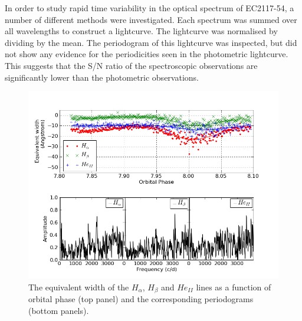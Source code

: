 In order to study rapid time variability in the optical spectrum of EC2117-54, a number of different methods were investigated. Each spectrum was summed over all wavelengths to construct a lightcurve. The lightcurve was normalised by dividing by the mean. The periodogram of this lightcurve was inspected, but did not show any evidence for the periodicities seen in the photometric lightcurve. This suggests that the S/N ratio of the spectroscopic observations are significantly lower than the photometric observations. 
\begin{figure}[t]
 \centering
 \includegraphics[width=\columnwidth,bb=0 0 800 600]{spectroscopy/lightcurves/eq_wid_lc.png}
 
 \caption[Equivalent width time-series]{The equivalent width of the $H_{\alpha}$, $H_{\beta}$ and $He_{II}$ lines as a function of orbital phase (top panel) and the corresponding periodograms (bottom panels).}
\label{eq_width_lc}
\end{figure}
